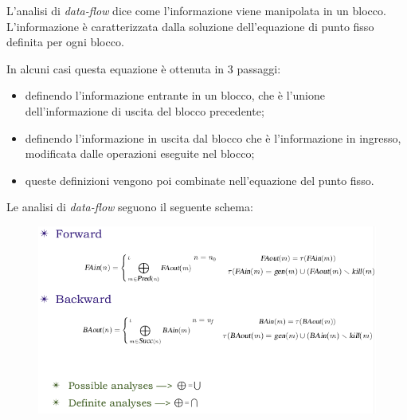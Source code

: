 \documentclass[a4paper, 11pt]{report}
\begin{document}
\noindent
L'analisi di \textit{data-flow} dice come l'informazione viene manipolata in un blocco. L'informazione è caratterizzata dalla soluzione dell'equazione di punto fisso definita per ogni blocco.

\noindent
In alcuni casi questa equazione è ottenuta in 3 passaggi: \begin{itemize}
	\item definendo l'informazione entrante in un blocco, che è l'unione dell'informazione di uscita del blocco precedente;
	\item definendo l'informazione in uscita dal blocco che è l'informazione in ingresso, modificata dalle operazioni eseguite nel blocco;
	\item queste definizioni vengono poi combinate nell'equazione del punto fisso.
\end{itemize}

Le analisi di \textit{data-flow} seguono il seguente schema:
\begin{figure}[H]
	\centering
	\includegraphics[scale=0.376]{FB}
\end{figure}

\newpage
\end{document}
